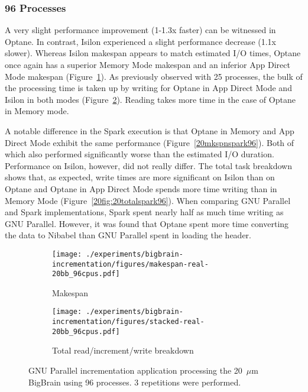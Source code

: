 \documentclass[conference]{IEEEtran}
\begin{document}
\subsubsection{96 Processes}

A very slight performance improvement (1-1.3x faster) can be witnessed in Optane. In 
contrast, Isilon 
experienced a slight performance decrease (1.1x slower). Whereas Isilon makespan appears to match
estimated I/O times, Optane once again has a superior Memory Mode makespan and an inferior App Direct
Mode makespan (Figure~\ref{fig:20mksp96}). As previously observed with 25 processes,
the bulk of the processing time is taken up by writing for Optane in App Direct Mode and 
Isilon in both modes (Figure~\ref{fig:20total96}). Reading takes more time in the case of Optane in Memory mode. 


A notable difference in the Spark execution is that Optane in Memory and App Direct Mode
exhibit the same performance (Figure~\ref{20mkspnspark96}). Both of which also performed
significantly worse than the estimated I/O duration. Performance on Isilon, however, did
not really differ. The total task breakdown shows that, as expected, write times are more
significant on Isilon than on Optane and Optane in App Direct Mode spends more time writing
than in Memory Mode (Figure~\ref{20fig:20totalspark96}). When comparing GNU Parallel and 
Spark implementations, Spark spent nearly half as much time writing as GNU Parallel. However,
it was found that Optane spent more time converting the data to Nibabel than GNU Parallel spent
in loading the header.

\begin{figure*}
    \begin{subfigure}{\columnwidth}
        \centering
    \texttt{[image: ./experiments/bigbrain-incrementation/figures/makespan-real-20bb\_96cpus.pdf]}
    \caption{Makespan}\label{fig:20mksp96}
\end{subfigure}
\begin{subfigure}{\columnwidth}
        \centering
    \texttt{[image: ./experiments/bigbrain-incrementation/figures/stacked-real-20bb\_96cpus.pdf]}
    \caption{Total read/increment/write breakdown}\label{fig:20total96}
\end{subfigure}
\caption{GNU Parallel incrementation application processing the 20~$\mu$m BigBrain using
96 processes. 3 repetitions were performed.}\label{fig:2096}
\end{figure*}
\end{document}
